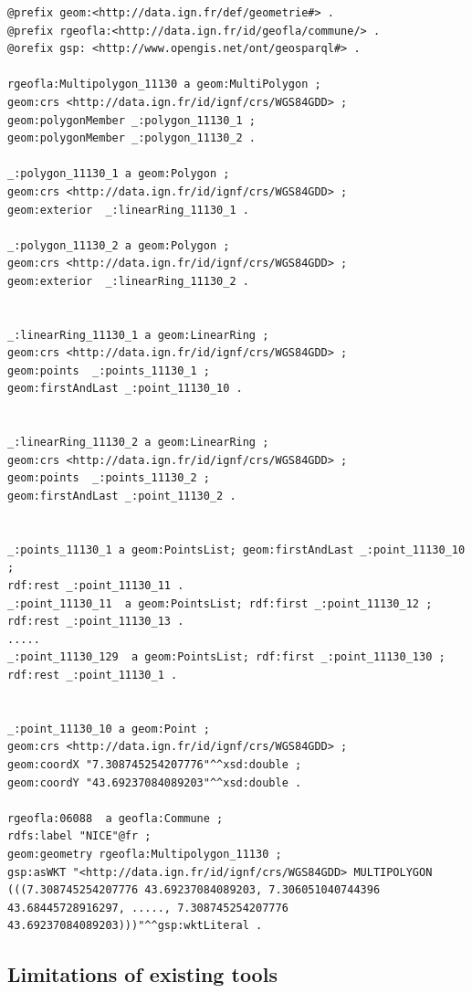 \begin{lstlisting}
@prefix geom:<http://data.ign.fr/def/geometrie#> .
@prefix rgeofla:<http://data.ign.fr/id/geofla/commune/> .
@orefix gsp: <http://www.opengis.net/ont/geosparql#> .

rgeofla:Multipolygon_11130 a geom:MultiPolygon ;
geom:crs <http://data.ign.fr/id/ignf/crs/WGS84GDD> ;
geom:polygonMember _:polygon_11130_1 ;
geom:polygonMember _:polygon_11130_2 .

_:polygon_11130_1 a geom:Polygon ;
geom:crs <http://data.ign.fr/id/ignf/crs/WGS84GDD> ;
geom:exterior  _:linearRing_11130_1 .

_:polygon_11130_2 a geom:Polygon ;
geom:crs <http://data.ign.fr/id/ignf/crs/WGS84GDD> ;
geom:exterior  _:linearRing_11130_2 .


_:linearRing_11130_1 a geom:LinearRing ;
geom:crs <http://data.ign.fr/id/ignf/crs/WGS84GDD> ;
geom:points  _:points_11130_1 ;
geom:firstAndLast _:point_11130_10 .


_:linearRing_11130_2 a geom:LinearRing ;
geom:crs <http://data.ign.fr/id/ignf/crs/WGS84GDD> ;
geom:points  _:points_11130_2 ;
geom:firstAndLast _:point_11130_2 .


_:points_11130_1 a geom:PointsList; geom:firstAndLast _:point_11130_10 ;
rdf:rest _:point_11130_11 .
_:point_11130_11  a geom:PointsList; rdf:first _:point_11130_12 ;
rdf:rest _:point_11130_13 .
.....
_:point_11130_129  a geom:PointsList; rdf:first _:point_11130_130 ;
rdf:rest _:point_11130_1 .


_:point_11130_10 a geom:Point ;
geom:crs <http://data.ign.fr/id/ignf/crs/WGS84GDD> ;
geom:coordX "7.308745254207776"^^xsd:double ;
geom:coordY "43.69237084089203"^^xsd:double .

rgeofla:06088  a geofla:Commune ;
rdfs:label "NICE"@fr ;
geom:geometry rgeofla:Multipolygon_11130 ;
gsp:asWKT "<http://data.ign.fr/id/ignf/crs/WGS84GDD> MULTIPOLYGON (((7.308745254207776 43.69237084089203, 7.306051040744396 43.68445728916297, ....., 7.308745254207776 43.69237084089203)))"^^gsp:wktLiteral .

\end{lstlisting}


\subsection{Limitations of existing tools}
\label{sec:limitations}

